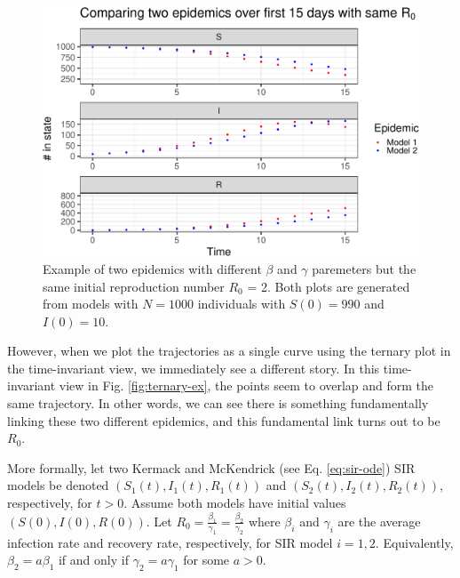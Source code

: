\documentclass[
  shortnames]{jss}
\begin{document}
\begin{CodeChunk}
\begin{figure}[H]

{\centering \includegraphics{Figs/unnamed-chunk-2-1} 

}

\caption{\label{fig:different-scales-standard}Example of two epidemics with different $\beta$ and $\gamma$ paremeters but the same initial reproduction number $R_0$ = 2.  Both plots are generated from models with $N= 1000$ individuals with $S(0) = 990$ and $I(0) = 10$.}\label{fig:unnamed-chunk-2}
\end{figure}
\end{CodeChunk}

However, when we plot the trajectories as a single curve using the
ternary plot in the time-invariant view, we immediately see a different
story. In this time-invariant view in Fig. \ref{fig:ternary-ex}, the
points seem to overlap and form the same trajectory. In other words, we
can see there is something fundamentally linking these two different
epidemics, and this fundamental link turns out to be \(R_0\).

More formally, let two Kermack and McKendrick (see Eq.
\eqref{eq:sir-ode}) SIR models be denoted \((S_1(t), I_1(t), R_1(t))\)
and \((S_2(t), I_2(t), R_2(t))\), respectively, for \(t > 0\). Assume
both models have initial values \((S(0), I(0), R(0))\). Let
\(R_0 = \frac{\beta_1}{\gamma_1} = \frac{\beta_2}{\gamma_2}\) where
\(\beta_i\) and \(\gamma_i\) are the average infection rate and recovery
rate, respectively, for SIR model \(i=1, 2\). Equivalently,
\(\beta_2 = a \beta_1\) if and only if \(\gamma_2 = a \gamma_1\) for
some \(a > 0\).
\end{document}
